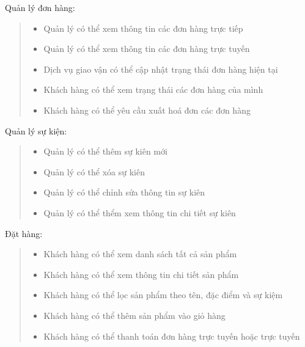         Quản lý đơn hàng:
        \begin{quote}
            \begin{itemize}
                \item Quản lý có thể xem thông tin các đơn hàng trực tiếp
                \item Quản lý có thể xem thông tin các đơn hàng trực tuyến
                \item Dịch vụ giao vận có thể cập nhật trạng thái đơn hàng hiện tại
                \item Khách hàng có thể xem trạng thái các đơn hàng của mình
                \item Khách hàng có thể yêu cầu xuất hoá đơn các đơn hàng
            \end{itemize}
        \end{quote}
        
        Quản lý sự kiện:
        \begin{quote}
            \begin{itemize}
                \item Quản lý có thể thêm sự kiên mới
                \item Quản lý có thể xóa sự kiên
                \item Quản lý có thể chỉnh sửa thông tin sự kiên
                \item Quản lý có thể thểm xem thông tin chi tiết sự kiên
            \end{itemize}
        \end{quote}
        
        Đặt hàng:
        \begin{quote}
            \begin{itemize}
                \item Khách hàng có thể xem danh sách tất cả sản phẩm
                \item Khách hàng có thể xem thông tin chi tiết sản phẩm
                \item Khách hàng có thể lọc sản phẩm theo tên, đặc điểm và sự kiệm
                \item Khách hàng có thể thêm sản phẩm vào giỏ hàng
                \item Khách hàng có thể thanh toán đơn hàng trực tuyến hoặc trực tuyến
            \end{itemize}
        \end{quote}
    

